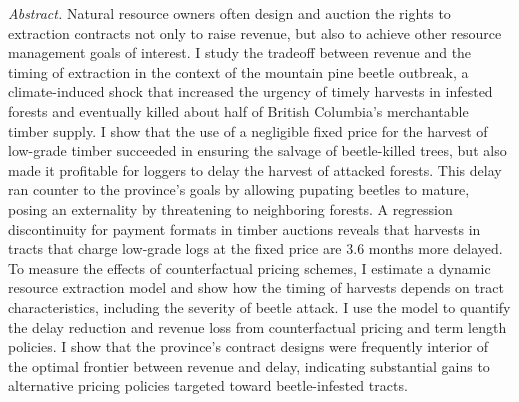 \documentclass[11pt,letterpaper]{article}
\begin{document}
\textit{Abstract. }
Natural resource owners often design and auction the rights to extraction contracts not only to raise revenue, but also to achieve other resource management goals of interest.
I study the tradeoff between revenue and the timing of extraction in the context of the mountain pine beetle outbreak, a climate-induced shock that increased the urgency of timely harvests in infested forests and eventually killed about half of British Columbia's merchantable timber supply. 
I show that the use of a negligible fixed price for the harvest of low-grade timber succeeded in ensuring the salvage of beetle-killed trees, but also made it profitable for loggers to delay the harvest of attacked forests. 
This delay ran counter to the province's goals by allowing pupating beetles to mature, posing an externality by threatening to neighboring forests. 
A regression discontinuity for payment formats in timber auctions reveals that harvests in tracts that charge low-grade logs at the fixed price are 3.6 months more delayed. 
To measure the effects of counterfactual pricing schemes, I estimate a dynamic resource extraction model and show how the timing of harvests depends on tract characteristics, including the severity of beetle attack.
I use the model to quantify the delay reduction and revenue loss from counterfactual pricing and term length policies.
I show that the province's contract designs were frequently interior of the optimal frontier between revenue and delay, indicating substantial gains to alternative pricing policies targeted toward beetle-infested tracts.
\end{document}
